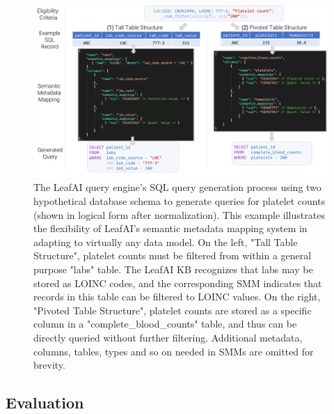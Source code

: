 \documentclass[../main.tex]{subfiles}
\begin{document}
\begin{figure}[h]
  \includegraphics[scale=0.53]{figures/leafai_smm.pdf}  
\caption{The LeafAI query engine's SQL query generation process using two hypothetical database schema to generate queries for platelet counts (shown in logical form after normalization). This example illustrates the flexibility of LeafAI's semantic metadata mapping system in adapting to virtually any data model. On the left, "Tall Table Structure", platelet counts must be filtered from within a general purpose "labs" table. The LeafAI KB recognizes that labs may be stored as LOINC codes, and the corresponding SMM indicates that records in this table can be filtered to LOINC values. On the right, "Pivoted Table Structure", platelet counts are stored as a specific column in a "complete\_blood\_counts" table, and thus can be directly queried without further filtering. Additional metadata, columns, tables, types and so on needed in SMMs are omitted for brevity.}
\label{fig_leafai_smm}
\end{figure}

\subsection*{Evaluation}
\end{document}
